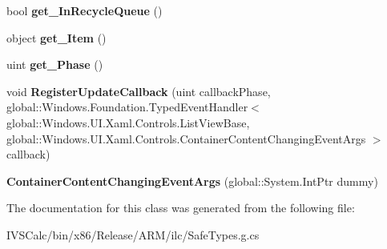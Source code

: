 \begin{DoxyCompactItemize}
\item 
\mbox{\label{class_windows_1_1_u_i_1_1_xaml_1_1_controls_1_1_container_content_changing_event_args_aa88d1a956dccd408c22cd68822cbf018}} 
bool {\bfseries get\+\_\+\+In\+Recycle\+Queue} ()
\item 
\mbox{\label{class_windows_1_1_u_i_1_1_xaml_1_1_controls_1_1_container_content_changing_event_args_adf6a56892a3645903bdbeb798faa1e67}} 
object {\bfseries get\+\_\+\+Item} ()
\item 
\mbox{\label{class_windows_1_1_u_i_1_1_xaml_1_1_controls_1_1_container_content_changing_event_args_a83b5777887886032cce986dfbafd12ac}} 
uint {\bfseries get\+\_\+\+Phase} ()
\item 
\mbox{\label{class_windows_1_1_u_i_1_1_xaml_1_1_controls_1_1_container_content_changing_event_args_af9bbdca8851131ee69d2767595d51531}} 
void {\bfseries Register\+Update\+Callback} (uint callback\+Phase, global\+::\+Windows.\+Foundation.\+Typed\+Event\+Handler$<$ global\+::\+Windows.\+U\+I.\+Xaml.\+Controls.\+List\+View\+Base, global\+::\+Windows.\+U\+I.\+Xaml.\+Controls.\+Container\+Content\+Changing\+Event\+Args $>$ callback)
\item 
\mbox{\label{class_windows_1_1_u_i_1_1_xaml_1_1_controls_1_1_container_content_changing_event_args_a04e2ae3d4530956b6f2478107d6aca2a}} 
{\bfseries Container\+Content\+Changing\+Event\+Args} (global\+::\+System.\+Int\+Ptr dummy)
\end{DoxyCompactItemize}


The documentation for this class was generated from the following file\+:\begin{DoxyCompactItemize}
\item 
I\+V\+S\+Calc/bin/x86/\+Release/\+A\+R\+M/ilc/Safe\+Types.\+g.\+cs\end{DoxyCompactItemize}
